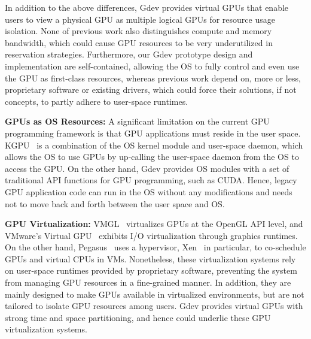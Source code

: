 In addition to the above differences, Gdev provides virtual GPUs that
enable users to view a physical GPU as multiple logical GPUs for
resource usage isolation.
None of previous work also distinguishes compute and memory bandwidth,
which could cause GPU resources to be very underutilized in
reservation strategies.
Furthermore, our Gdev prototype design and implementation are
self-contained, allowing the OS to fully control and even use the GPU as
first-class resources, whereas previous work depend on, more or less,
proprietary software or existing drivers, which could force their
solutions, if not concepts, to partly adhere to user-space runtimes.

\begin{comment}
Comparisons of Gdev and representatives of the above GPU resource
management approaches are summarized in Table~\ref{tab:related_work}.
\begin{table*}[t]
 \caption{Comparisons of Gdev and prior GPU resource management
 approaches.}
 \label{tab:related_work}
 \begin{center}
  {\sf
  \begin{tabular}{|l|p{12.8cm}|}
   \hline
   \hline
  \end{tabular}
  }
 \end{center}
\vspace{-1em}
\end{table*}
\end{comment}

\textbf{GPUs as OS Resources:}
A significant limitation on the current GPU programming framework is
that GPU applications must reside in the user space.
KGPU~\cite{Sun_SYSTOR12} is a combination of the OS kernel
module and user-space daemon, which allows the OS to use GPUs by
up-calling the user-space daemon from the OS to access the GPU.
On the other hand, Gdev provides OS modules with a set of traditional
API functions for GPU programming, such as CUDA.
Hence, legacy GPU application code can run in the OS without any
modifications and needs not to move back and forth between the user
space and OS.

\textbf{GPU Virtualization:}
VMGL~\cite{Lagar-Cavilla_VEE07} virtualizes GPUs at the OpenGL
API level, and VMware's Virtual GPU~\cite{Dowty_SIGOPS09} exhibits I/O
virtualization through graphics runtimes.
On the other hand, Pegasus~\cite{Gupta_ATC11} uses a hypervisor,
Xen~\cite{Barham_SOSP03} in particular, to co-schedule GPUs and virtual
CPUs in VMs.
Nonetheless, these virtualization systems rely on user-space runtimes
provided by proprietary software, preventing the system from managing
GPU resources in a fine-grained manner. 
In addition, they are mainly designed to make GPUs available in
virtualized environments, but are not tailored to isolate GPU resources
among users.
Gdev provides virtual GPUs with strong time and space partitioning, and
hence could underlie these GPU virtualization systems.

